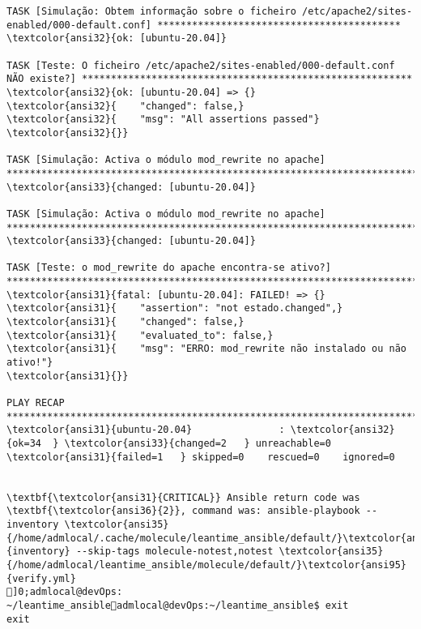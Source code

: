 \documentclass{scrartcl}
\begin{document}
\begin{Verbatim}
TASK [Simulação: Obtem informação sobre o ficheiro /etc/apache2/sites-enabled/000-default.conf] ******************************************
\textcolor{ansi32}{ok: [ubuntu-20.04]}

TASK [Teste: O ficheiro /etc/apache2/sites-enabled/000-default.conf NÃO existe?] *********************************************************
\textcolor{ansi32}{ok: [ubuntu-20.04] => {}
\textcolor{ansi32}{    "changed": false,}
\textcolor{ansi32}{    "msg": "All assertions passed"}
\textcolor{ansi32}{}}

TASK [Simulação: Activa o módulo mod_rewrite no apache] **********************************************************************************
\textcolor{ansi33}{changed: [ubuntu-20.04]}

TASK [Simulação: Activa o módulo mod_rewrite no apache] **********************************************************************************
\textcolor{ansi33}{changed: [ubuntu-20.04]}

TASK [Teste: o mod_rewrite do apache encontra-se ativo?] *********************************************************************************
\textcolor{ansi31}{fatal: [ubuntu-20.04]: FAILED! => {}
\textcolor{ansi31}{    "assertion": "not estado.changed",}
\textcolor{ansi31}{    "changed": false,}
\textcolor{ansi31}{    "evaluated_to": false,}
\textcolor{ansi31}{    "msg": "ERRO: mod_rewrite não instalado ou não ativo!"}
\textcolor{ansi31}{}}

PLAY RECAP *******************************************************************************************************************************
\textcolor{ansi31}{ubuntu-20.04}               : \textcolor{ansi32}{ok=34  } \textcolor{ansi33}{changed=2   } unreachable=0    \textcolor{ansi31}{failed=1   } skipped=0    rescued=0    ignored=0


\textbf{\textcolor{ansi31}{CRITICAL}} Ansible return code was \textbf{\textcolor{ansi36}{2}}, command was: ansible-playbook --inventory \textcolor{ansi35}{/home/admlocal/.cache/molecule/leantime_ansible/default/}\textcolor{ansi95}{inventory} --skip-tags molecule-notest,notest \textcolor{ansi35}{/home/admlocal/leantime_ansible/molecule/default/}\textcolor{ansi95}{verify.yml}
]0;admlocal@devOps: ~/leantime_ansibleadmlocal@devOps:~/leantime_ansible$ exit
exit

\end{Verbatim}
\end{document}

